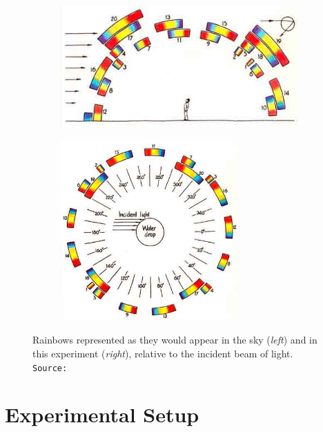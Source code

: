 \begin{refsection}
 
\begin{figure}[!htb]
    \centering
    \begin{subfigure}[b]{0.5\linewidth}
    \centering
    \includegraphics[width=\textwidth]{figs/multipleRainbows.jpeg}
    \end{subfigure}%
    \begin{subfigure}[b]{0.5\linewidth}
    \centering
    \includegraphics[width=0.75\textwidth]{figs/multipleRainbowsLab.jpeg}
    \end{subfigure}
    \caption{Rainbows represented as they would appear in the sky (\textit{left}) and in this experiment (\textit{right}), relative to the incident beam of light. \texttt{Source:~\cite{walker_multiple_1976}}}
    \label{fig:rainbow}
\end{figure}

 
\section*{Experimental Setup}


\end{refsection}
